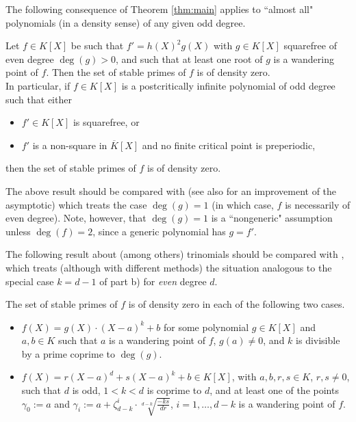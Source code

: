 \documentclass[a4paper]{amsart}
\begin{document}
The following consequence of Theorem \ref{thm:main} applies to ``almost all" polynomials (in a density sense) of any given odd degree. 
\begin{corollary}
\label{cor:odddeg}
Let $f\in K[X]$ be such that $f' = h(X)^2g(X)$ with $g\in K[X]$ squarefree of even degree $\deg(g)>0$, and such that at least one root of $g$ is a wandering point of $f$.
Then the set of stable primes of $f$ is of density zero.\\
In particular, if $f\in K[X]$ is a postcritically infinite polynomial of odd degree such that either
\begin{itemize}
\item[i)] $f'\in K[X]$ is squarefree, or 
\item[ii)] $f'$ is a non-square in $\overline{K}[X]$ and no finite critical point is preperiodic,
\end{itemize}
then the set of stable primes of $f$ is of density zero.
\end{corollary}
The above result should be compared with \cite[Theorem 1.2]{MOS} (see also \cite[Theorem 1.2]{OS} for an improvement of the asymptotic) which treats the case $\deg(g)=1$ (in which case, $f$ is necessarily of even degree). Note, however, that $\deg(g)=1$ is a ``nongeneric" assumption unless $\deg(f)=2$, since a generic polynomial has $g=f'$.


The following result about (among others) trinomials should be compared with \cite[Corollary 1.3]{MOS}, which treats (although with different methods) the situation analogous to the special case $k=d-1$ of part b) for {\it even} degree $d$.
\begin{corollary}
\label{cor:trinom}
The set of stable primes of $f$ is of density zero in each of the following two cases.
\begin{itemize}
\item[a)]
$f(X)=g(X)\cdot (X-a)^k + b$ for some polynomial $g\in K[X]$ and $a,b\in K$ such that $a$ is a wandering point of $f$, $g(a)\ne 0$, and $k$ is divisible by a prime coprime to $\deg(g)$. 
\item[b)]
$f(X)=r(X-a)^d+s(X-a)^{k}+b\in K[X]$, with $a,b,r,s\in K$, $r,s\ne 0$, such that $d$ is odd, $1<k<d$ is coprime to $d$, and 
at least one of 
the points $\gamma_0:=a$ and $\gamma_i:= a+\zeta_{d-k}^i \cdot \sqrt[d-k]{\frac{-ks}{dr}}$, $i=1,\dots, d-k$ 
is a wandering point of $f$. 
\end{itemize}%
\end{corollary}
\end{document}
